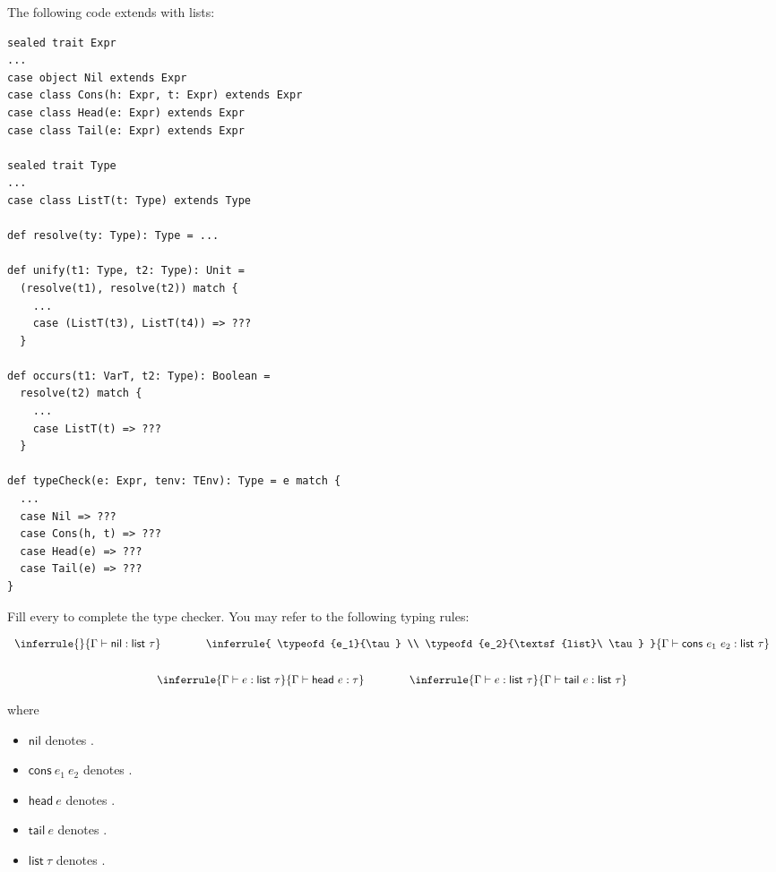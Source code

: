 \begin{exercise}

\item The following code extends \lang with lists:
\begin{verbatim}
sealed trait Expr
...
case object Nil extends Expr
case class Cons(h: Expr, t: Expr) extends Expr
case class Head(e: Expr) extends Expr
case class Tail(e: Expr) extends Expr

sealed trait Type
...
case class ListT(t: Type) extends Type

def resolve(ty: Type): Type = ...

def unify(t1: Type, t2: Type): Unit =
  (resolve(t1), resolve(t2)) match {
    ...
    case (ListT(t3), ListT(t4)) => ???
  }

def occurs(t1: VarT, t2: Type): Boolean =
  resolve(t2) match {
    ...
    case ListT(t) => ???
  }

def typeCheck(e: Expr, tenv: TEnv): Type = e match {
  ...
  case Nil => ???
  case Cons(h, t) => ???
  case Head(e) => ???
  case Tail(e) => ???
}
\end{verbatim}

Fill every  to complete the type checker.
You may refer to the following typing rules:

\[
\begin{array}{c}
  \inferrule
  {}
  { \typeofd{\textsf{nil}}{\textsf{list}\ \tau} }
  \qquad\qquad
  \inferrule
  { \typeofd{e_1}{\tau} \\ \typeofd{e_2}{\textsf{list}\ \tau} }
  { \typeofd{\textsf{cons}\ e_1\ e_2}{\textsf{list}\ \tau} }
  \\[2em]
  \inferrule
  { \typeofd{e}{\textsf{list}\ \tau} }
  { \typeofd{\textsf{head}\ e}{\tau} }
  \qquad\qquad
  \inferrule
  { \typeofd{e}{\textsf{list}\ \tau} }
  { \typeofd{\textsf{tail}\ e}{\textsf{list}\ \tau} }
\end{array}
\]

where

\begin{itemize}
  \item $\textsf{nil}$ denotes .
  \item $\textsf{cons}\ e_1\ e_2$ denotes .
  \item $\textsf{head}\ e$ denotes .
  \item $\textsf{tail}\ e$ denotes .
  \item $\textsf{list}\ \tau$ denotes .
\end{itemize}

\end{exercise}

